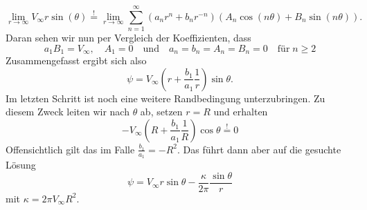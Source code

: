 \documentclass[12pt]{exam}
\begin{document}
\begin{questions}
\begin{solution}
        \begin{equation*}
            \lim_{r \to \infty} V_{\infty} r \sin(\theta) \overset{!}{=} \lim_{r \to \infty} \sum_{n=1}^{\infty} (a_n r^n + b_n r^{-n})(A_n \cos(n \theta) + B_n \sin(n \theta)).
        \end{equation*}
        Daran sehen wir nun per Vergleich der Koeffizienten, dass
        \begin{equation*}
            a_1 B_1 = V_{\infty}, \quad A_1 = 0  \quad \text{und} \quad a_n = b_n = A_n = B_n = 0 \quad \text{für} \; n \geq 2
        \end{equation*}
        Zusammengefasst ergibt sich also
        \begin{equation*}
            \psi = V_{\infty} \left( r + \frac{b_1}{a_1} \frac{1}{r} \right) \sin \theta.
        \end{equation*}
        Im letzten Schritt ist noch eine weitere Randbedingung unterzubringen. Zu diesem Zweck leiten wir nach $\theta$ ab, setzen $r = R$ und erhalten
        \begin{equation*}
            - V_{\infty} \left( R + \frac{b_1}{a_1} \frac{1}{R} \right) \cos \theta \overset{!}{=} 0
        \end{equation*}
        Offensichtlich gilt das im Falle $\frac{b_1}{a_1} = -R^2$. Das führt dann aber auf die gesuchte Lösung
        \begin{equation*}
            \psi = V_{\infty} r \sin \theta - \frac{\kappa}{2 \pi} \frac{\sin \theta}{r}
        \end{equation*}
        mit $\kappa = 2 \pi V_{\infty} R^2$.
    \end{solution}
    

\end{questions}
\end{document}
